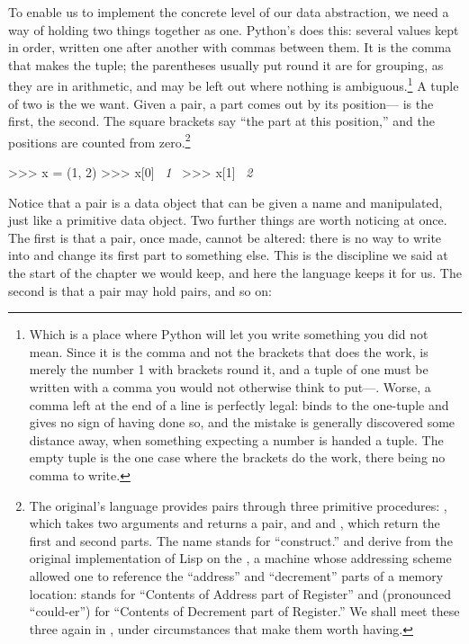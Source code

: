 To enable us to implement the concrete level of our data abstraction, we need a
way of holding two things together as one.  Python's  does this:
several values kept in order, written one after another with commas between
them.  It is the comma that makes the tuple; the parentheses usually put round
it are for grouping, as they are in arithmetic, and may be left out where
nothing is ambiguous.\footnote{Which is a place where Python will let you write
something you did not mean.  Since it is the comma and not the brackets that
does the work,  is merely the number 1 with brackets round it, and a
tuple of one must be written with a comma you would not otherwise think to
put---.  Worse, a comma left at the end of a line is perfectly legal:
 binds  to the one-tuple  and gives no
sign of having done so, and the mistake is generally discovered some distance
away, when something expecting a number is handed a tuple.  The empty tuple
\code{()} is the one case where the brackets do the work, there being no comma
to write.} A tuple of two is the  we want.  Given a pair, a part
comes out by its position--- is the first,  the second.
The square brackets say ``the part at this position,'' and the positions are
counted from zero.\footnote{The original's language provides pairs through
three primitive procedures: , which takes two arguments and returns a pair, and
 and , which return the first and second parts.  The name
 stands for ``construct.''   and  derive from
the original implementation of Lisp on the , a machine whose
addressing scheme allowed one to reference the ``address'' and ``decrement''
parts of a memory location:  stands for ``Contents of Address part of
Register'' and  (pronounced ``could-er'') for ``Contents of Decrement
part of Register.''  We shall meet these three again in
, under circumstances that make them worth having.}

\begin{codeBlock}
>>> x = (1, 2)
>>> x[0]
~\textit{1}~
>>> x[1]
~\textit{2}~
\end{codeBlock}

\noindent
Notice that a pair is a data object that can be given a name and manipulated,
just like a primitive data object.  Two further things are worth noticing at
once.  The first is that a pair, once made, cannot be altered: there is no way
to write into  and change its first part to something else.  This is
the discipline we said at the start of the chapter we would keep, and here the
language keeps it for us.  The second is that a pair may hold pairs, and so on:

